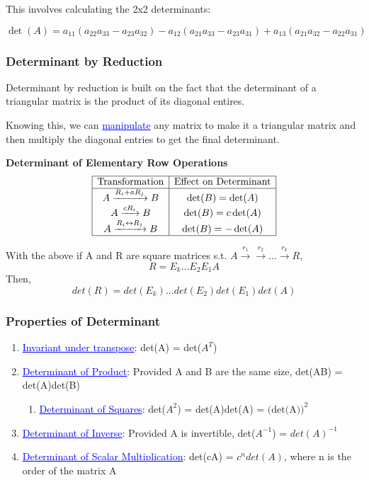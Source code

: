 \documentclass{article}
\newcommand{\bul}[1]{\textcolor{blue}{\underline{#1}}}
\newcommand{\sub}[1]{\vspace{10pt}\textbf{#1}}
\newcommand{\ssbreak}{\vspace{5pt}}
\begin{document}
This involves calculating the 2x2 determinants:

\[
\det(A) = a_{11}(a_{22}a_{33} - a_{23}a_{32}) 
- a_{12}(a_{21}a_{33} - a_{23}a_{31}) 
+ a_{13}(a_{21}a_{32} - a_{22}a_{31})
\]

\subsubsection{Determinant by Reduction}
Determinant by reduction is built on the fact that the determinant of a triangular matrix is the product of its diagonal entires.

\ssbreak

Knowing this, we can \bul{manipulate} any matrix to make it a triangular matrix and then multiply the diagonal entries to get the final determinant.

\sub{Determinant of Elementary Row Operations}
\[
\begin{array}{|c|c|}
\hline
\text{Transformation} & \text{Effect on Determinant} \\
\hline
A \xrightarrow{R_i + aR_j} B & \det(B) = \det(A) \\
A \xrightarrow{cR_i} B & \det(B) = c \det(A) \\
A \xrightarrow{R_i \leftrightarrow R_j} B & \det(B) = - \det(A) \\
\hline
\end{array}
\]

With the above if A and R are square matrices s.t. $A \xrightarrow{r_1} \xrightarrow{ r_2 } ... \xrightarrow{ r_k } R$,
\[
R = E_k...E_2E_1A
\]
Then,
\[
det(R) = det(E_k)...det(E_2)det(E_1)det(A)
\]

\subsubsection{Properties of Determinant}
\begin{enumerate}
    \item \bul{Invariant under transpose}: det(A) = det($A^T$)
    \item \bul{Determinant of Product}: Provided A and B are the same size, det(AB) = det(A)det(B)
    \begin{enumerate}
        \item \bul{Determinant of Squares}: det($A^2$) = det(A)det(A) = $\text{(det(A))}^2$
    \end{enumerate}
    \item \bul{Determinant of Inverse}: Provided A is invertible, det($A^{-1}$) = $det(A)^{-1}$
    \item \bul{Determinant of Scalar Multiplication}: det(cA) = $c^ndet(A)$, where n is the order of the matrix A
\end{enumerate}
\end{document}
